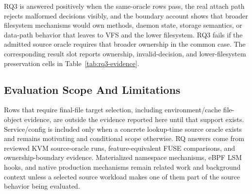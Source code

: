 RQ3 is answered positively when the same-oracle rows pass, the
real attach path rejects malformed decisions visibly, and the boundary account
shows that broader filesystem mechanisms would own methods, daemon state,
storage semantics, or data-path behavior that \namei leaves to VFS and the
lower filesystem. RQ3 fails if the admitted source oracle requires that broader
ownership in the common case. The corresponding result slot reports ownership,
invalid-decision, and lower-filesystem preservation cells in
Table~\ref{tab:rq3-evidence}.

\subsection{Evaluation Scope And Limitations}

Rows that require final-file target selection, including environment/cache
file-object evidence, are outside the evidence reported here until that support
exists. Service/config is included only when a concrete lookup-time source
oracle exists and remains motivating and conditional scope otherwise. RQ
answers come from reviewed KVM source-oracle runs,
feature-equivalent FUSE comparisons, and ownership-boundary evidence.
Materialized namespace mechanisms, eBPF LSM hooks, and native production
mechanisms remain related work and background context unless a selected source
workload makes one of them part of the source behavior being evaluated.
